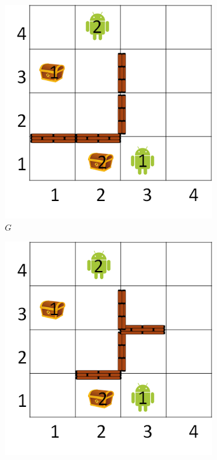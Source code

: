 \documentclass[letterpaper]{article} %
\def\
UrlFont{\rm}  %
\theoremstyle{definition}
\begin{document}
\begin{figure}[t]
        \centering    
    \begin{subfigure}[b]{0.45\columnwidth}\centering  
      \includegraphics[scale=0.3]{Figures/G.png}
      \caption{$G$}
      \label{fig:G}
    \end{subfigure}
    \begin{subfigure}[b]{0.45\columnwidth}\centering  
      \includegraphics[scale=.3]{Figures/Gs0.png}

\end{subfigure}
\end{figure}
\end{document}
